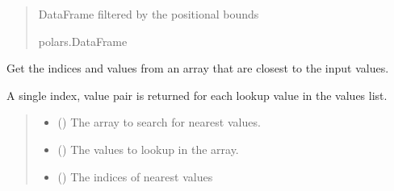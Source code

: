 \documentclass[letterpaper,10pt,english]{sphinxmanual}
\begin{document}
\begin{fulllineitems}
\begin{quote}
\begin{description}
\begin{itemize}
\end{itemize}

\sphinxAtStartPar
DataFrame filtered by the positional bounds

\sphinxAtStartPar
polars.DataFrame

\end{description}\end{quote}

\end{fulllineitems}


\begin{fulllineitems}
\label{\detokenize{misc:glomar_gridding.utils.find_nearest}}
\pysigstartsignatures
\pysiglinewithargsret
{}
{\sphinxparamcomma {}}
{}
\pysigstopsignatures
\sphinxAtStartPar
Get the indices and values from an array that are closest to the input
values.

\sphinxAtStartPar
A single index, value pair is returned for each look\sphinxhyphen{}up value in the values
list.
\begin{quote}\begin{description}
\begin{itemize}
\item {}
\sphinxAtStartPar
{} () \textendash{} The array to search for nearest values.

\item {}
\sphinxAtStartPar
{} () \textendash{} The values to look\sphinxhyphen{}up in the array.

\end{itemize}

\sphinxAtStartPar
{}

\sphinxAtStartPar
\begin{itemize}
\item {}
\sphinxAtStartPar
{} () \textendash{} The indices of nearest values


\end{itemize}
\end{description}
\end{quote}
\end{fulllineitems}
\end{document}
